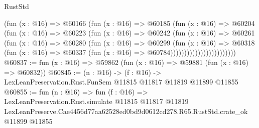 \begin{lexlean}{RustStd}
\begin{coremodule}
                              (fun (x : @16) =>
                              @60166
                                (fun (x : @16) =>
                                @60185
                                  (fun (x : @16) =>
                                  @60204
                                    (fun (x : @16) =>
                                    @60223
                                      (fun (x : @16) =>
                                      @60242
                                        (fun (x : @16) =>
                                        @60261
                                          (fun (x : @16) =>
                                          @60280
                                            (fun (x : @16) =>
                                            @60299
                                              (fun (x : @16) =>
                                              @60318
                                                (fun (x : @16) =>
                                                @60337
                                                  (fun (x : @16) => @60784))))))))))))))))))))))))
@60837 := fun (x : @16) => @59862 (fun (x : @16) => @59881 (fun (x : @16) => @60832))
@60845 := (n : @16) ->
  (f : @16) -> LexLeanPreservation.Rust.FunSem @11815 @11817 @11819 @11899 @11855
@60855 := fun (n : @16) =>
  fun (f : @16) =>
  LexLeanPreservation.Rust.simulate
    @11815
    @11817
    @11819
    LexLeanPreserve.Cae4456d77aa62528ed0bd9d0612cd278.R65.RustStd.crate_ok
    @11899
    @11855
\end{coremodule}
\end{lexlean}
